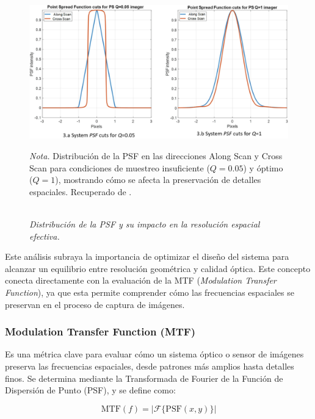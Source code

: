         \begin{figure}[H]
            \caption{\doublespacing \\ \textit{Distribución de la PSF y su impacto en la resolución espacial efectiva.}} 
            \centering
            \includegraphics[width=1\linewidth]{images/psf.jpg}
            \begin{justify}
                \textit{Nota.} Distribución de la PSF en las direcciones Along Scan y Cross Scan para condiciones de muestreo insuficiente (\( Q = 0.05 \)) y óptimo (\( Q = 1 \)), mostrando cómo se afecta la preservación de detalles espaciales. Recuperado de \textcite{valenzuela2022new}.
            \end{justify}                    
            \label{fig:psf}
        \end{figure}
        

        Este análisis subraya la importancia de optimizar el diseño del sistema para alcanzar un equilibrio entre resolución geométrica y calidad óptica. Este concepto conecta directamente con la evaluación de la MTF (\textit{Modulation Transfer Function}), ya que esta permite comprender cómo las frecuencias espaciales se preservan en el proceso de captura de imágenes.
        
        \subsubsection{Modulation Transfer Function (MTF)}
            
            Es una métrica clave para evaluar cómo un sistema óptico o sensor de imágenes preserva las frecuencias espaciales, desde patrones más amplios hasta detalles finos. Se determina mediante la Transformada de Fourier de la Función de Dispersión de Punto (PSF), y se define como:

            \[
            \text{MTF}(f) = |\mathcal{F}\{\text{PSF}(x, y)\}|
            \]
            
